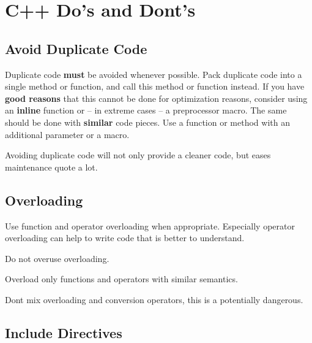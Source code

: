 %
%


\section{C++ Do's and Dont's}

%
%

\subsection{Avoid Duplicate Code}

Duplicate code \textbf{must} be avoided whenever possible.  Pack 
duplicate code into a single method or function, and call this method 
or function instead.  If you have \textbf{good reasons} that this 
cannot be done for optimization reasons, consider using an 
\textbf{inline} function or -- in extreme cases -- a preprocessor 
macro.  The same should be done with \textbf{similar} code pieces.  
Use a function or method with an additional parameter or a macro.

Avoiding duplicate code will not only provide a cleaner code, but
eases maintenance quote a lot.


%
%

\subsection{Overloading}

Use function and operator overloading when appropriate.  Especially 
operator overloading can help to write code that is better to 
understand.

\begin{note} 
  Do not overuse overloading.
\end{note}

\begin{note} 
  Overload only functions and operators with similar semantics.
\end{note}

\begin{note}  
  Dont mix overloading and conversion operators, this is a
  potentially dangerous.
\end{note}


%
%

\subsection{Include Directives}

